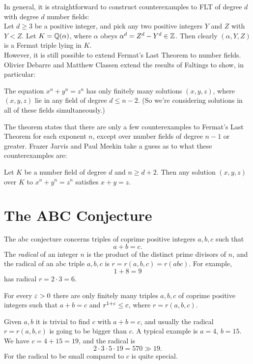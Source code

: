 \documentclass{book}
\begin{document}
In general, it is straightforward to construct counterexamples to FLT
of degree $d$ with degree $d$ number fields: \\
Let $d\ge 3$ be a positive integer, and pick any two positive integers
$Y$ and $Z$ with $Y<Z$. Let $K = \mathbb{Q}(\alpha)$, where $\alpha$ obeys
$\alpha^d = Z^d-Y^d \in \mathbb{Z}$. Then clearly $(\alpha,Y,Z)$ is a Fermat triple lying in $K$. \\

However, it is still possible to extend Fermat's Last Theorem to number fields. Olivier Debarre and Matthew Classen \cite{deb-cla} extend the results of Faltings to show, in particular:
\begin{theorem}\label{th:dc}
The equation $x^n+y^n=z^n$ has only finitely many solutions $(x,y,z)$,
where $(x,y,z)$ lie in any field of degree $d\leq n-2$.  (So we're
considering solutions in all of these fields simultaneously.)
\end{theorem}

The theorem states that there are only a few counterexamples to Fermat's Last Theorem for each exponent $n$, except over number fields of degree $n-1$ or greater. Frazer Jarvis and Paul Meekin \cite{jar} take a guess as to what these counterexamples are:
\begin{conjecture}\label{conj:jarv}
Let $K$ be a number field of degree $d$ and $n\geq d+2$. Then any solution $(x,y,z)$ over $K$ to $x^n+y^n=z^n$ satisfies $x+y=z$.
\end{conjecture}

\section{The ABC Conjecture}
The abc conjecture
concerns triples of coprime positive integers $a,b,c$  such that
$$
a+b = c.
$$
The {\em radical} of an integer $n$ is the product
of the distinct prime divisors of $n$, and the radical
of an abc triple $a,b,c$ is $r=r(a,b,c)=r(abc)$.
For example,
$$
  1 + 8 = 9
$$
has radical $r=2\cdot 3=6$.

\begin{conjecture}\label{conj:abc}
For every $\varepsilon>0$ there are only finitely many
triples $a,b,c$ of coprime positive integers such
that $a+b=c$ and $r^{1+\varepsilon}\leq c$,
where $r=r(a,b,c)$.
\end{conjecture}

Given $a,b$ it is trivial to find $c$ with $a+b=c$, and
usually the radical $r=r(a,b,c)$ is going to be bigger
than $c$.   A typical example is $a=4$, $b=15$.
We have $c=4+15=19$, and the radical is
$$2\cdot 3\cdot5\cdot19=570 \gg 19.$$
For the radical to be small compared to $c$
is quite special.
\end{document}
